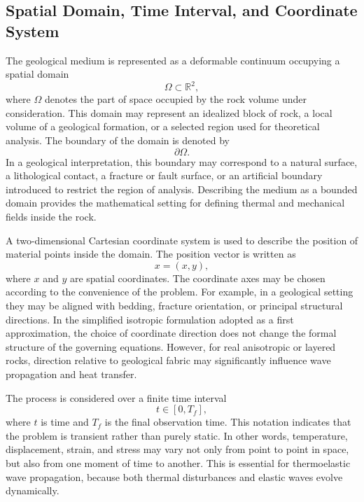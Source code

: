 \subsection{Spatial Domain, Time Interval, and Coordinate System}

The geological medium is represented as a deformable continuum occupying a spatial domain
\begin{equation}
\label{eq:domain-2d}
\Omega \subset \mathbb{R}^{2},
\end{equation}
where \(\Omega\) denotes the part of space occupied by the rock volume under consideration. This domain may represent an idealized block of rock, a local volume of a geological formation, or a selected region used for theoretical analysis. The boundary of the domain is denoted by
\begin{equation}
\partial \Omega .
\end{equation}
In a geological interpretation, this boundary may correspond to a natural surface, a lithological contact, a fracture or fault surface, or an artificial boundary introduced to restrict the region of analysis. Describing the medium as a bounded domain provides the mathematical setting for defining thermal and mechanical fields inside the rock.

A two-dimensional Cartesian coordinate system is used to describe the position of material points inside the domain. The position vector is written as
\begin{equation}
x = (x, y),
\end{equation}
where \(x\) and \(y\)  are spatial coordinates. The coordinate axes may be chosen according to the convenience of the problem. For example, in a geological setting they may be aligned with bedding, fracture orientation, or principal structural directions. In the simplified isotropic formulation adopted as a first approximation, the choice of coordinate direction does not change the formal structure of the governing equations. However, for real anisotropic or layered rocks, direction relative to geological fabric may significantly influence wave propagation and heat transfer.

The process is considered over a finite time interval
\begin{equation}
t \in [0,T_f],
\end{equation}
where \(t\) is time and \(T_f\) is the final observation time. This notation indicates that the problem is transient rather than purely static. In other words, temperature, displacement, strain, and stress may vary not only from point to point in space, but also from one moment of time to another. This is essential for thermoelastic wave propagation, because both thermal disturbances and elastic waves evolve dynamically.

